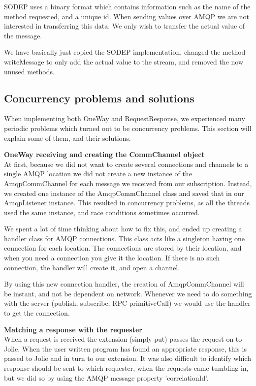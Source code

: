 SODEP uses a binary format which contains information such as the name of the method requested, and a unique id. When sending values over AMQP we are not interested in transferring this data. We only wish to transfer the actual value of the message.

We have basically just copied the SODEP implementation, changed the method writeMessage to only add the actual value to the stream, and removed the now unused methods.

\subsection{Concurrency problems and solutions}
When implementing both OneWay and RequestResponse, we experienced many periodic problems which turned out to be concurrency problems. This section will explain some of them, and their solutions.

\noindent\textbf{OneWay receiving and creating the CommChannel object}\\
At first, because we did not want to create several connections and channels to a single AMQP location we did not create a new instance of the AmqpCommChannel for each message we received from our subscription. Instead, we created one instance of the AmqpCommChannel class and saved that in our AmqpListener instance. This resulted in concurrency problems, as all the threads used the same instance, and race conditions sometimes occurred.

We spent a lot of time thinking about how to fix this, and ended up creating a handler class for AMQP connections. This class acts like a singleton having one connection for each location. The connections are stored by their location, and when you need a connection you give it the location. If there is no such connection, the handler will create it, and open a channel.

By using this new connection handler, the creation of AmqpCommChannel will be instant, and not be dependent on network. Whenever we need to do something with the server (publish, subscribe, RPC primitiveCall) we would use the handler to get the connection.

\noindent\textbf{Matching a response with the requester}\\
When a request is received the extension (simply put) passes the request on to Jolie. When the user written program has found an appropriate response, this is passed to Jolie and in turn to our extension. It was also difficult to identify which response should be sent to which requester, when the requests came tumbling in, but we did so by using the AMQP message property 'correlationId'.


